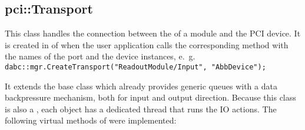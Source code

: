 \subsection{pci::Transport}
This class handles the connection between
the  of a module and the PCI device.
It is created in  of 
when the user application calls the corresponding 
method with the names of the port and the device instances, e.~g.~ \\
{\tt dabc::mgr.CreateTransport("ReadoutModule/Input", "AbbDevice");}

It extends the base class  which already provides
generic  queues with a data backpressure mechanism, 
both for input and output direction. 
Because this class is also a ,
each  object has a  dedicated thread that runs
the IO actions.
The following virtual methods of  were implemented:

